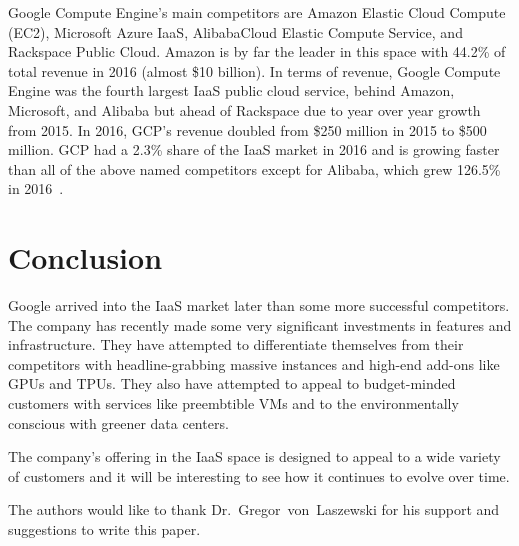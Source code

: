 Google Compute Engine's main competitors are Amazon Elastic Cloud
Compute (EC2), Microsoft Azure IaaS, AlibabaCloud Elastic Compute
Service, and Rackspace Public Cloud. Amazon is by far the leader in
this space with 44.2\% of total revenue in 2016 (almost \$10
billion). In terms of revenue, Google Compute Engine was the fourth
largest IaaS public cloud service, behind Amazon, Microsoft, and
Alibaba but ahead of Rackspace due to year over year growth from
2015. In 2016, GCP's revenue doubled from \$250 million in 2015
to \$500 million. GCP had a 2.3\% share of the IaaS market in 2016 and
is growing faster than all of the above named competitors except for
Alibaba, which grew 126.5\% in 2016~\cite{hid-sp18-419-gartnerpr2017}.


\section{Conclusion}

Google arrived into the IaaS market later than some more successful
competitors. The company has recently made some very significant
investments in features and infrastructure. They have attempted to
differentiate themselves from their competitors with headline-grabbing
massive instances and high-end add-ons like GPUs and TPUs. They also
have attempted to appeal to budget-minded customers with services like
preembtible VMs and to the environmentally conscious with greener data
centers.

The company's offering in the IaaS space is designed to appeal to a
wide variety of customers and it will be interesting to see how it
continues to evolve over time.


\begin{acks}

  The authors would like to thank Dr.~Gregor~von~Laszewski for his
  support and suggestions to write this paper.

\end{acks}


 

